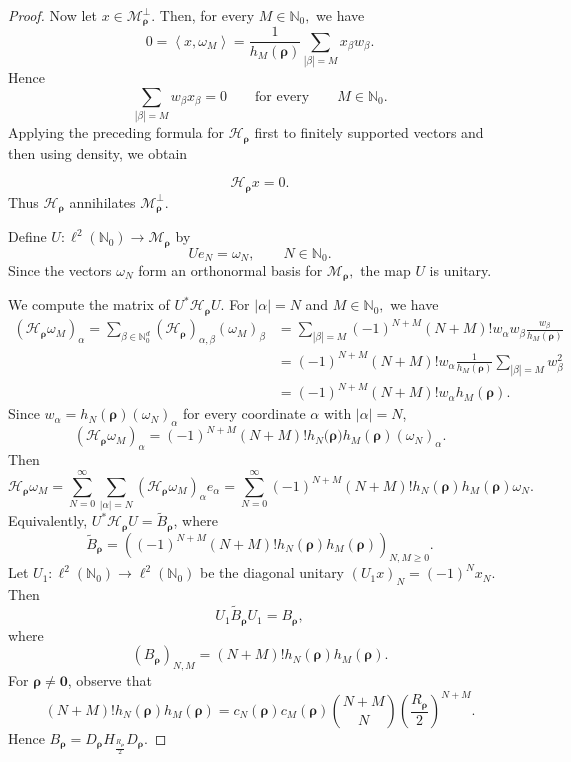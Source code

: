 \documentclass[12pt, reqno]{amsart}
\numberwithin{equation}{section}
\begin{document}
\begin{proof}
Now let $x\in\mathcal{M}_{\boldsymbol{\rho}}^{\perp}.$
Then, for every $M\in\mathbb{N}_{0},$ we have
\[
0
=
\left\langle x,\omega_M\right\rangle
=
\frac{1}{h_M(\boldsymbol{\rho})}
\sum_{|\beta|=M}x_{\beta}w_{\beta}.
\]
Hence
\[
\sum_{|\beta|=M}w_{\beta}x_{\beta}=0
\qquad
\text{for every}
\qquad
M\in\mathbb{N}_{0}.
\]
Applying the preceding formula  for $\mathcal{H}_{\boldsymbol{\rho}}$ first to finitely supported vectors and then using density, we obtain

\[
\mathcal{H}_{\boldsymbol{\rho}}x=0.
\]
Thus $\mathcal{H}_{\boldsymbol{\rho}}$ annihilates
$\mathcal{M}_{\boldsymbol{\rho}}^{\perp}.$

Define $U:\ell^2(\mathbb{N}_{0})\to \mathcal{M}_{\boldsymbol{\rho}}$  by
\[
Ue_N=\omega_N,
\qquad
N\in\mathbb{N}_{0}.
\]
Since the vectors $\omega_N$ form an orthonormal basis for
$\mathcal{M}_{\boldsymbol{\rho}},$ the map \(U\) is unitary.

We compute the matrix of $U^{*}\mathcal{H}_{\boldsymbol{\rho}}U.$ For $|\alpha|=N$ and
$M\in\mathbb{N}_{0},$ we have
\[
\begin{aligned}
(\mathcal{H}_{\boldsymbol{\rho}}\omega_M)_{\alpha}=\sum_{\beta\in\mathbb{N}_0^d}(\mathcal{H}_{\boldsymbol{\rho}})_{\alpha,\beta}(\omega_M)_{\beta}
&=
\sum_{|\beta|=M}
(-1)^{N+M}(N+M)!w_{\alpha}w_{\beta}
\frac{w_{\beta}}{h_M(\boldsymbol{\rho})}                                      \\
&=
(-1)^{N+M}(N+M)!w_{\alpha}
\frac{1}{h_M(\boldsymbol{\rho})}
\sum_{|\beta|=M}w_{\beta}^{2}                              \\
&=
(-1)^{N+M}(N+M)!w_{\alpha}h_M(\boldsymbol{\rho}).
\end{aligned}
\]
Since $w_{\alpha}=h_N(\boldsymbol{\rho})(\omega_N)_{\alpha}$ for every coordinate $\alpha$ with $|\alpha|=N$,
\[
(\mathcal{H}_{\boldsymbol{\rho}}\omega_M)_{\alpha}= (-1)^{N+M}(N+M)!h_N(\boldsymbol{\rho)}h_M(\boldsymbol{\rho})(\omega_N)_{\alpha}.
\]
Then
\[
\mathcal{H}_{\boldsymbol{\rho}}\omega_M
= \sum_{N=0}^{\infty}\sum_{|\alpha|=N}(\mathcal{H}_{\boldsymbol{\rho}}\omega_M)_{\alpha}e_{\alpha}=
\sum_{N=0}^{\infty}
(-1)^{N+M}
(N+M)!h_N(\boldsymbol{\rho})h_M(\boldsymbol{\rho})
\omega_N.
\]
Equivalently, $U^{*}\mathcal{H}_{\boldsymbol{\rho}}U=\widetilde{B}_{\boldsymbol{\rho}}$, where
\[
\widetilde{B}_{\boldsymbol{\rho}}
=
\left(
(-1)^{N+M}(N+M)!h_N(\boldsymbol{\rho})h_M(\boldsymbol{\rho})
\right)_{N,M\geq 0}.
\]
Let $U_1:\ell^{2}(\mathbb{N}_{0})\to\ell^{2}(\mathbb{N}_{0})$
be the diagonal unitary $(U_1x)_N=(-1)^Nx_N.$ Then
\[
U_1\widetilde{B}_{\boldsymbol{\rho}}U_1
=
B_{\boldsymbol{\rho}},
\]
where
\[
(B_{\boldsymbol{\rho}})_{N,M}
=
(N+M)!h_N(\boldsymbol{\rho})h_M(\boldsymbol{\rho}).
\]
For $\boldsymbol{\rho}\neq \mathbf{0}$, observe that
\[
(N+M)!h_N(\boldsymbol{\rho})h_M(\boldsymbol{\rho})
=
c_N(\boldsymbol{\rho})c_M(\boldsymbol{\rho})
\binom{N+M}{N}\left(\frac{R_{\boldsymbol{\rho}}}{2}\right)^{N+M}.
\]
Hence
$B_{\boldsymbol{\rho}}
= D_{\boldsymbol{\rho}}H_{\frac{R_{\boldsymbol{\rho}}}{2}}D_{\boldsymbol{\rho}}.$

\end{proof}
\end{document}
